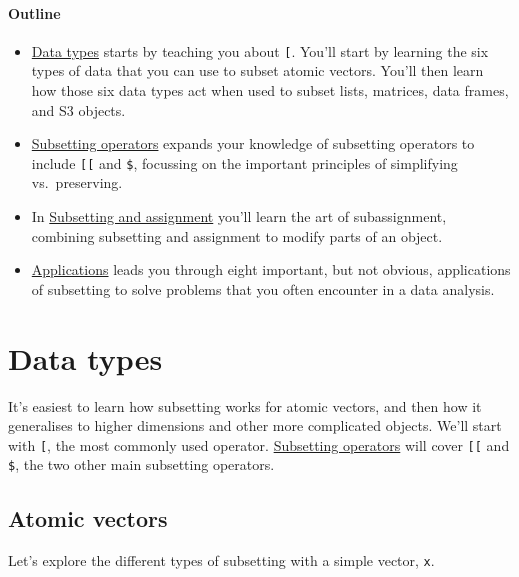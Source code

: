 \hypertarget{outline}{%
\paragraph{Outline}\label{outline}}

\begin{itemize}
\item
  \protect\hyperlink{data-types}{Data types} starts by teaching you
  about \texttt{{[}}. You'll start by learning the six types of data
  that you can use to subset atomic vectors. You'll then learn how those
  six data types act when used to subset lists, matrices, data frames,
  and S3 objects.
\item
  \protect\hyperlink{subsetting-operators}{Subsetting operators} expands
  your knowledge of subsetting operators to include \texttt{{[}{[}} and
  \texttt{\$}, focussing on the important principles of simplifying
  vs.~preserving.
\item
  In \protect\hyperlink{subassignment}{Subsetting and assignment} you'll
  learn the art of subassignment, combining subsetting and assignment to
  modify parts of an object.
\item
  \protect\hyperlink{applications}{Applications} leads you through eight
  important, but not obvious, applications of subsetting to solve
  problems that you often encounter in a data analysis.
\end{itemize}

\hypertarget{data-types}{%
\section{Data types}\label{data-types}}

It's easiest to learn how subsetting works for atomic vectors, and then
how it generalises to higher dimensions and other more complicated
objects. We'll start with \texttt{{[}}, the most commonly used operator.
\protect\hyperlink{subsetting-operators}{Subsetting operators} will
cover \texttt{{[}{[}} and \texttt{\$}, the two other main subsetting
operators.

\hypertarget{atomic-vectors}{%
\subsection{Atomic vectors}\label{atomic-vectors}}

Let's explore the different types of subsetting with a simple vector,
\texttt{x}. 
 \indexc{[}

